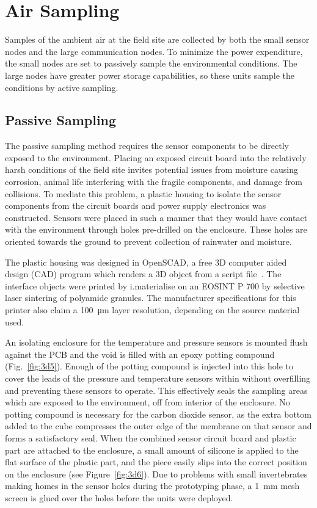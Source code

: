 \documentclass[journal]{IEEEtran}
\begin{document}
\section{Air Sampling}

Samples of the ambient air at the field site are collected by both the small sensor nodes and the large communication nodes.  To minimize the power expenditure, the small nodes are set to passively sample the environmental conditions.  The large nodes have greater power storage capabilities, so these units sample the conditions by active sampling.  

\subsection{Passive Sampling}
The passive sampling method requires the sensor components to be directly exposed to the environment.  Placing an exposed circuit board into the relatively harsh conditions of the field site invites potential issues from moisture causing corrosion, animal life interfering with the fragile components, and damage from collisions.  To mediate this problem, a plastic housing to isolate the sensor components from the circuit boards and power supply electronics was constructed.  Sensors were placed in such a manner that they would have contact with the environment through holes pre-drilled on the enclosure.  These holes are oriented towards the ground to prevent collection of rainwater and moisture.  

The plastic housing was designed in OpenSCAD, a free 3D computer aided design (CAD) program which renders a 3D object from a script file~\cite{kintel_openscad_2011}.  The interface objects were printed by i.materialise on an EOSINT P 700 by selective laser sintering of polyamide granules.  The manufacturer specifications for this printer also claim a \SI{100}{\micro\meter} layer resolution, depending on the source material used. 

An isolating enclosure for the temperature and pressure sensors is mounted flush against the PCB and the void is filled with an epoxy potting compound (Fig.~\ref{fig:3d5}).  Enough of the potting compound is injected into this hole to cover the leads of the pressure and temperature sensors within without overfilling and preventing these sensors to operate.  This effectively seals the sampling areas which are exposed to the environment, off from interior of the enclosure.  No potting compound is necessary for the carbon dioxide sensor, as the extra bottom added to the cube compresses the outer edge of the membrane on that sensor and forms a satisfactory seal.  When the combined sensor circuit board and plastic part are attached to the enclosure, a small amount of silicone is applied to the flat surface of the plastic part, and the piece easily slips into the correct position on the enclosure (see Figure~\ref{fig:3d6}).  Due to problems with small invertebrates making homes in the sensor holes during the prototyping phase, a \SI{1}{\milli\meter} mesh screen is glued over the holes before the units were deployed.
\end{document}
